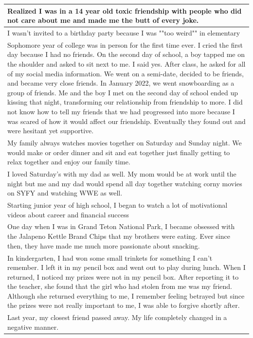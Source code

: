 \documentclass[
  .7em,
  letterpaper,
  DIV=11,
  numbers=noendperiod]{scrartcl}
\begin{document}
\begin{table}
\begin{tabular}{l}
\hline
Realized I was in a 14 year old toxic friendship with people who did not care about me and made me the butt of every joke.\\
\hline
I wasn't invited to a birthday party because I was ""too weird"" in elementary\\
\hline
Sophomore year of college was in person for the first time ever. I cried the first day because I had no friends. On the second day of school, a boy tapped me on the shoulder and asked to sit next to me. I said yes. After class, he asked for all of my social media information. We went on a semi-date, decided to be friends, and became very close friends. In January 2022, we went snowboarding as a group of friends. Me and the boy I met on the second day of school ended up kissing that night, transforming our relationship from friendship to more. I did not know how to tell my friends that we had progressed into more because I was scared of how it would affect our friendship. Eventually they found out and were hesitant yet supportive.\\
\hline
My family always watches movies together on Saturday and Sunday night. We would make or order dinner and sit and eat together just finally getting to relax together and enjoy our family time.\\
\hline
I loved Saturday's with my dad as well. My mom would be at work until the night but me and my dad would spend all day together watching corny movies on SYFY and watching WWE as well.\\
\hline
Starting junior year of high school, I began to watch a lot of motivational videos about career and financial success\\
\hline
One day when I was in Grand Teton National Park, I became obsessed with the Jalapeno Kettle Brand Chips that my brothers were eating. Ever since then, they have made me much more passionate about snacking.\\
\hline
In kindergarten, I had won some small trinkets for something I can’t remember. I left it in my pencil box and went out to play during lunch. When I returned, I noticed my prizes were not in my pencil box. After reporting it to the teacher, she found that the girl who had stolen from me was my friend. Although she returned everything to me, I remember feeling betrayed but since the prizes were not really important to me, I was able to forgive shortly after.\\
\hline
Last year, my closest friend passed away. My life completely changed in a negative manner.\\

\end{tabular}
\end{table}
\end{document}
